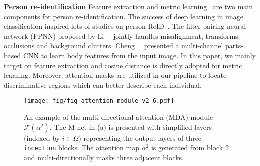 \documentclass[10pt,twocolumn,letterpaper]{article}
\begin{document}
\noindent \textbf{Person re-identification}
Feature extraction and metric learning~\cite{koestinger2012large,liao2015person} are two main components for person re-identification.
The success of deep learning in image classification inspired lots of studies on person ReID~\cite{cheng2016person, li2014deepreid, xiao2016learning, wu2016personnet, varior2016gated, su2016deep, ustinova2015multiregion, li2017person, xiao2017joint}.
The filter pairing neural network (FPNN) proposed by Li~\etal~\cite{li2014deepreid} jointly handles misalignment, transforms, occlusions and background clutters.
Cheng~\etal~\cite{cheng2016person} presented a multi-channel parts-based CNN to learn body features from the input image.
In this paper, we mainly target on feature extraction and cosine distance is directly adopted for metric learning.
Moreover, attention masks are utilized in our pipeline to locate discriminative regions which can better describe each individual.













\begin{figure}[t]
\centering
\texttt{[image: fig/fig\_attention\_module\_v2\_6.pdf]}
\caption{An example of the multi-directional attention (MDA) module $\mathcal{F}(\alpha^2)$. The M-net in (a) is presented with simplified layers (indexed by $i\in\Omega$) representing the output layers of three \texttt{inception} blocks. The attention map $\alpha^2$ is generated from block $2$ and multi-directionally masks three adjacent blocks.
}
\label{fig:attention_module}
\end{figure}
\end{document}
